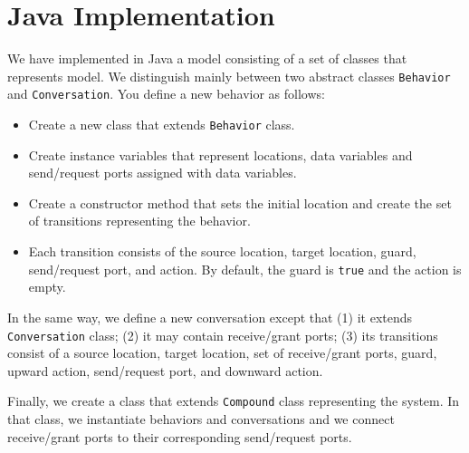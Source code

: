 \section{Java Implementation}
\label{sec:java}
We have implemented in Java a model consisting of a set of classes that represents {\compmodel} model. We distinguish mainly between two abstract classes \texttt{Behavior} and \texttt{Conversation}. You define a new behavior as follows:
\begin{itemize}
\item Create a new class that extends \texttt{Behavior} class. 
\item Create instance variables that represent locations, data variables and send/request ports assigned with data variables.
\item Create a constructor method that sets the initial location and create the set of transitions representing the behavior. 
\item Each transition consists of the source location, target location, guard, send/request port, and action. By default, the guard is \texttt{true} and the action is empty.  
\end{itemize}
In the same way, we define a new conversation except that (1) it extends \texttt{Conversation} class; (2) it may contain receive/grant ports; (3) its transitions consist of a source location, target location, set of receive/grant ports, guard, upward action, send/request port, and downward action.

Finally, we create a class that extends \texttt{Compound} class representing the system. In that class, we instantiate behaviors and conversations and we connect receive/grant ports to their corresponding send/request ports. 


